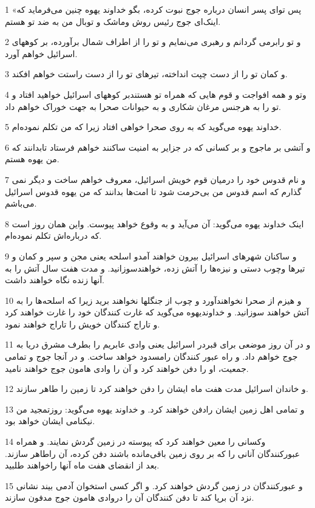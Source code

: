 \par 1 «پس تو‌ای پسر انسان درباره جوج نبوت کرده، بگو خداوند یهوه چنین می‌فرماید که اینک‌ای جوج رئیس روش وماشک و توبال من به ضد تو هستم.
\par 2 و تو رابرمی گردانم و رهبری می‌نمایم و تو را از اطراف شمال برآورده، بر کوههای اسرائیل خواهم آورد.
\par 3 و کمان تو را از دست چپت انداخته، تیرهای تو را از دست راستت خواهم افکند.
\par 4 وتو و همه افواجت و قوم هایی که همراه تو هستندبر کوههای اسرائیل خواهید افتاد و تو را به هرجنس مرغان شکاری و به حیوانات صحرا به جهت خوراک خواهم داد.
\par 5 خداوند یهوه می‌گوید که به روی صحرا خواهی افتاد زیرا که من تکلم نموده‌ام.
\par 6 و آتشی بر ماجوج و بر کسانی که در جزایر به امنیت ساکنند خواهم فرستاد تابدانند که من یهوه هستم.
\par 7 و نام قدوس خود را درمیان قوم خویش اسرائیل، معروف خواهم ساخت و دیگر نمی گذارم که اسم قدوس من بی‌حرمت شود تا امت‌ها بدانند که من یهوه قدوس اسرائیل می‌باشم.
\par 8 اینک خداوند یهوه می‌گوید: آن می‌آید و به وقوع خواهد پیوست. واین همان روز است که درباره‌اش تکلم نموده‌ام.
\par 9 و ساکنان شهرهای اسرائیل بیرون خواهند آمدو اسلحه یعنی مجن و سپر و کمان و تیرها وچوب دستی و نیزه‌ها را آتش زده، خواهندسوزانید. و مدت هفت سال آتش را به آنها زنده نگاه خواهند داشت.
\par 10 و هیزم از صحرا نخواهندآورد و چوب از جنگلها نخواهند برید زیرا که اسلحه‌ها را به آتش خواهند سوزانید. و خداوندیهوه می‌گوید که غارت کنندگان خود را غارت خواهند کرد و تاراج کنندگان خویش را تاراج خواهند نمود.
\par 11 و در آن روز موضعی برای قبردر اسرائیل یعنی وادی عابریم را بطرف مشرق دریا به جوج خواهم داد. و راه عبور کنندگان رامسدود خواهد ساخت. و در آنجا جوج و تمامی جمعیت، او را دفن خواهند کرد و آن را وادی هامون جوج خواهند نامید.
\par 12 و خاندان اسرائیل مدت هفت ماه ایشان را دفن خواهند کرد تا زمین را طاهر سازند.
\par 13 و تمامی اهل زمین ایشان رادفن خواهند کرد. و خداوند یهوه می‌گوید: روزتمجید من نیکنامی ایشان خواهد بود.
\par 14 وکسانی را معین خواهند کرد که پیوسته در زمین گردش نمایند. و همراه عبورکنندگان آنانی را که بر روی زمین باقی‌مانده باشند دفن کرده، آن راطاهر سازند. بعد از انقضای هفت ماه آنها راخواهند طلبید.
\par 15 و عبورکنندگان در زمین گردش خواهند کرد. و اگر کسی استخوان آدمی بیند نشانی نزد آن برپا کند تا دفن کنندگان آن را دروادی هامون جوج مدفون سازند.
